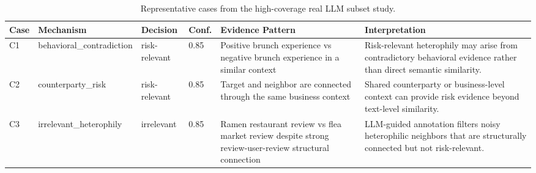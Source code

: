 ﻿\begin{table}[t]
\centering
\small
\caption{Representative cases from the high-coverage real LLM subset study.}
\label{tab:case_study}
\begin{tabular}{p{}p{}p{}p{}p{}p{}}
\toprule
Case & Mechanism & Decision & Conf. & Evidence Pattern & Interpretation \\
\midrule
C1 & behavioral\_contradiction & risk-relevant & 0.85 & Positive brunch experience vs negative brunch experience in a similar context & Risk-relevant heterophily may arise from contradictory behavioral evidence rather than direct semantic similarity. \\
C2 & counterparty\_risk & risk-relevant & 0.85 & Target and neighbor are connected through the same business context & Shared counterparty or business-level context can provide risk evidence beyond text-level similarity. \\
C3 & irrelevant\_heterophily & irrelevant & 0.85 & Ramen restaurant review vs flea market review despite strong review-user-review structural connection & LLM-guided annotation filters noisy heterophilic neighbors that are structurally connected but not risk-relevant. \\
\bottomrule
\end{tabular}
\end{table}
